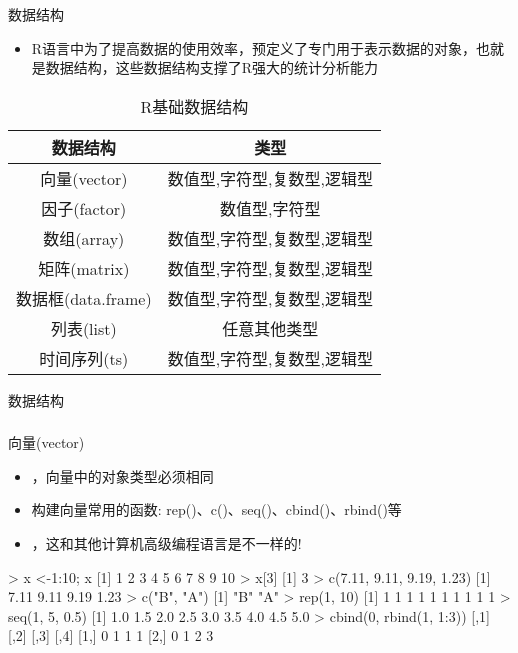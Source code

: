 \begin{frame}[t]{\subsecname}{数据结构}
  \begin{itemize}
  \item R语言中为了提高数据的使用效率，预定义了专门用于表示数据的对象，也就是数据结构，这些数据结构支撑了R强大的统计分析能力
  \end{itemize}
  \begin{table} \centering \small
    \begin{tabular}{|c|c|}
      \toprule
      \rowcolor{LightCyan}
      数据结构 & 类型\\\hline
      向量(vector) & 数值型,字符型,复数型,逻辑型\\\hline
      因子(factor) & 数值型,字符型\\\hline
      数组(array) & 数值型,字符型,复数型,逻辑型\\\hline
      矩阵(matrix) & 数值型,字符型,复数型,逻辑型 \\\hline
      数据框(data.frame) & 数值型,字符型,复数型,逻辑型 \\\hline
      列表(list) & 任意其他类型 \\\hline
      时间序列(ts) & 数值型,字符型,复数型,逻辑型\\
      \bottomrule
    \end{tabular}
    \caption{R基础数据结构}
  \end{table}
\end{frame}

\begin{frame}[t,fragile]{\subsecname}{数据结构}
  \frametitle{}{向量(vector)}
  \begin{itemize}
  \item {}，向量中的对象类型必须相同
  \item 构建向量常用的函数: rep()、c()、seq()、cbind()、rbind()等
  \item {}，这和其他计算机高级编程语言是不一样的!
  \end{itemize}  

\begin{rcode}
> x <-1:10; x
[1]  1  2  3  4  5  6  7  8  9 10
> x[3]
[1] 3
> c(7.11, 9.11, 9.19, 1.23)
[1] 7.11 9.11 9.19 1.23
> c("B", "A")
[1] "B" "A"
> rep(1, 10)
[1] 1 1 1 1 1 1 1 1 1 1
> seq(1, 5, 0.5)
[1] 1.0 1.5 2.0 2.5 3.0 3.5 4.0 4.5 5.0
> cbind(0, rbind(1, 1:3))
     [,1] [,2] [,3] [,4]
[1,]    0    1    1    1
[2,]    0    1    2    3
\end{rcode}  
\end{frame}

